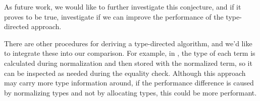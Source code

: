As future work, we would like to further investigate this conjecture, and if it proves to be true, investigate if we can improve the performance of the type-directed approach.

There are other procedures for deriving a type-directed algorithm, and we'd like to integrate these into our comparison.
For example, in \citet{elabzoo}, the type of each term is calculated during normalization and then stored with the normalized term, so it can be inspected as needed during the equality check.
Although this approach may carry more type information around, if the performance difference is caused by normalizing types and not by allocating types, this could be more performant.

% 
% 
% 


